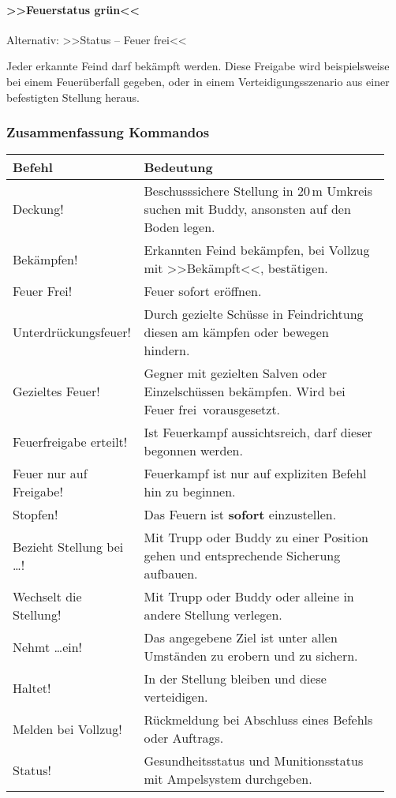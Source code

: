 \paragraph*{>>Feuerstatus grün<<}
	Alternativ: >>Status -- Feuer frei<<\par
	Jeder erkannte Feind darf bekämpft werden. Diese Freigabe wird beispielsweise bei einem Feuerüberfall gegeben, oder in einem Verteidigungsszenario aus einer befestigten Stellung heraus.
%
\subsubsection{Zusammenfassung Kommandos}
	\begin{longtable}{p{0.3\linewidth}p{0.65\linewidth}} 
		\toprule
		\textbf{Befehl} & \textbf{Bedeutung}\\
		\midrule
		Deckung! & Beschusssichere Stellung in 20\,m Umkreis suchen mit Buddy, ansonsten auf den Boden legen.\\
		Bekämpfen! & Erkannten Feind bekämpfen, bei Vollzug mit >>Bekämpft<<, bestätigen.\\
		Feuer Frei! & Feuer sofort eröffnen.\\
		Unterdrückungsfeuer! & Durch gezielte Schüsse in Feindrichtung diesen am kämpfen oder bewegen hindern.\\
		Gezieltes Feuer! & Gegner mit gezielten Salven oder Einzelschüssen bekämpfen. Wird bei \glqq Feuer frei\grqq\, vorausgesetzt.\\
		Feuerfreigabe erteilt! & Ist Feuerkampf aussichtsreich, darf dieser begonnen werden.\\
		Feuer nur auf Freigabe! & Feuerkampf ist nur auf expliziten Befehl hin zu beginnen.\\
		Stopfen! & Das Feuern ist \textbf{sofort} einzustellen.\\
		Bezieht Stellung bei \dots! & Mit Trupp oder Buddy zu einer Position gehen und entsprechende Sicherung aufbauen.\\
		Wechselt die Stellung! & Mit Trupp oder Buddy oder alleine in andere Stellung verlegen.\\
		Nehmt \dots ein! & Das angegebene Ziel ist unter allen Umständen zu erobern und zu sichern.\\
		Haltet! & In der Stellung bleiben und diese verteidigen.\\
		Melden bei Vollzug! & Rückmeldung bei Abschluss eines Befehls oder Auftrags.\\
		Status! & Gesundheitsstatus und Munitionsstatus mit Ampelsystem durchgeben.\\
		\bottomrule
	\end{longtable}
